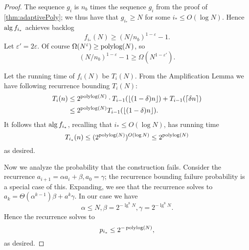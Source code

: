\begin{proof}
  The sequence $g_i$ is $n_b$ times the sequence $g_i$ from
  the proof of \cref{thm:adaptivePoly}; we thus have that $g_{i_*}
  \ge N$ for some $i_* \le O(\log N)$.
  Hence $\operatorname{\text{\textup{alg}}}{f_{i_*}}$ achieves backlog 
  $$f_{i_*}(N) \ge (N/n_b)^{1-\varepsilon}-1.$$
  Let $\varepsilon' = 2\varepsilon$. Of course $\Omega(N^\varepsilon)
  \ge \operatorname{\text{polylog}}(N)$, so $$(N/n_b)^{1-\varepsilon}-1 \ge
  \Omega(N^{1-\varepsilon'}).$$

  Let the running time of $f_i(N)$ be $T_i(N)$. From the
  Amplification Lemma we have following recurrence bounding $T_i(N)$:
  \begin{align*}
    T_i(n) &\le 2^{\operatorname{\text{polylog}}(N)} \cdot T_{i-1}(\left\lfloor (1-\delta)n \right\rfloor) + T_{i-1}(\left\lceil \delta n \right\rceil) \\
            &\le 2^{\operatorname{\text{polylog}}(N)}T_{i-1}(\left\lfloor (1-\delta)n \right\rfloor).
  \end{align*}
  It follows that $\operatorname{\text{\textup{alg}}}{f_{i_*}}$, recalling that $i_* \le O(\log N)$, has running time
  $$T_{i_*}(n) \le (2^{\operatorname{\text{polylog}}(N)})^{O(\log N)} \le 2^{\operatorname{\text{polylog}}(N)}$$
  as desired.

  Now we analyze the probability that the construction fails. 
  Consider the recurrence $a_{i+1} = \alpha a_i + \beta, a_0 =
  \gamma$; the recurrence bounding failure probability is a
  special case of this. Expanding, we see that the recurrence
  solves to $a_k = \Theta(\alpha^{k-1})\beta + a^k \gamma$.
  In our case we have 
  $$\alpha \le N, \beta = 2^{-\lg^8 N}, \gamma = 2^{-\lg^8 N}.$$
  Hence the recurrence solves to 
  $$p_{i_*} \le 2^{-\operatorname{\text{polylog}}(N)},$$
  as desired.

\end{proof}


